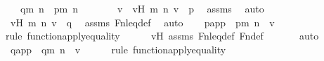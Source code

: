 \begin{isabellebody}
\ \ \ {\isachardoublequoteopen}q{\isacharbackquote}{\kern0pt}{\isacharless}{\kern0pt}m{\isacharcomma}{\kern0pt}\ n{\isachargreater}{\kern0pt}\ {\isacharequal}{\kern0pt}\ p{\isacharbackquote}{\kern0pt}{\isacharless}{\kern0pt}m{\isacharcomma}{\kern0pt}\ n{\isachargreater}{\kern0pt}{\isachardoublequoteclose}\ \isanewline
%
\isadelimproof
%
\endisadelimproof
%
\isatagproof
{}\isamarkupfalse%
\ {\isacharminus}{\kern0pt}\ \isanewline
\ \ \isamarkupfalse%
\ v\ \ vH{\isacharcolon}{\kern0pt}\ {\isachardoublequoteopen}{\isacharless}{\kern0pt}{\isacharless}{\kern0pt}m{\isacharcomma}{\kern0pt}\ n{\isachargreater}{\kern0pt}{\isacharcomma}{\kern0pt}\ v{\isachargreater}{\kern0pt}\ {\isasymin}\ p{\isachardoublequoteclose}\ \isamarkupfalse%
\ assms\ \isamarkupfalse%
\ auto\ \isanewline
\ \ \isamarkupfalse%
\ \isamarkupfalse%
\ vH{\isacharprime}{\kern0pt}{\isacharcolon}{\kern0pt}\ {\isachardoublequoteopen}{\isacharless}{\kern0pt}{\isacharless}{\kern0pt}m{\isacharcomma}{\kern0pt}\ n{\isachargreater}{\kern0pt}{\isacharcomma}{\kern0pt}\ v{\isachargreater}{\kern0pt}\ {\isasymin}\ q{\isachardoublequoteclose}\ \isamarkupfalse%
\ assms\ Fn{\isacharunderscore}{\kern0pt}leq{\isacharunderscore}{\kern0pt}def\ \isamarkupfalse%
\ auto\isanewline
\isanewline
\ \ \isamarkupfalse%
\ papp\ {\isacharcolon}{\kern0pt}\ {\isachardoublequoteopen}p{\isacharbackquote}{\kern0pt}{\isacharless}{\kern0pt}m{\isacharcomma}{\kern0pt}\ n{\isachargreater}{\kern0pt}\ {\isacharequal}{\kern0pt}\ v{\isachardoublequoteclose}\ \isanewline
\ \ \ \ \isamarkupfalse%
{\isacharparenleft}{\kern0pt}rule\ function{\isacharunderscore}{\kern0pt}apply{\isacharunderscore}{\kern0pt}equality{\isacharparenright}{\kern0pt}\isanewline
\ \ \ \ \isamarkupfalse%
\ vH\ assms\ Fn{\isacharunderscore}{\kern0pt}leq{\isacharunderscore}{\kern0pt}def\ Fn{\isacharunderscore}{\kern0pt}def\ \isanewline
\ \ \ \ \isamarkupfalse%
\ auto\isanewline
\isanewline
\ \ \isamarkupfalse%
\ qapp\ {\isacharcolon}{\kern0pt}\ {\isachardoublequoteopen}q{\isacharbackquote}{\kern0pt}{\isacharless}{\kern0pt}m{\isacharcomma}{\kern0pt}\ n{\isachargreater}{\kern0pt}\ {\isacharequal}{\kern0pt}\ v{\isachardoublequoteclose}\ \isanewline
\ \ \ \ \isamarkupfalse%
{\isacharparenleft}{\kern0pt}rule\ function{\isacharunderscore}{\kern0pt}apply{\isacharunderscore}{\kern0pt}equality{\isacharparenright}{\kern0pt}\isanewline

\end{isabellebody}
